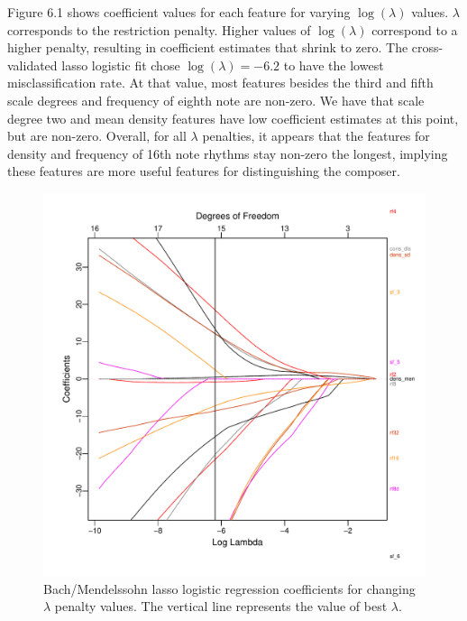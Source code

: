 \documentclass[12pt,twoside]{reedthesis}
\theoremstyle{definition}
\theoremstyle{definition}
\theoremstyle{definition}
\theoremstyle{remark}
\begin{document}
Figure 6.1 shows coefficient values for each feature for varying
\(\log(\lambda)\) values. \(\lambda\) corresponds to the restriction
penalty. Higher values of \(\log(\lambda)\) correspond to a higher
penalty, resulting in coefficient estimates that shrink to zero. The
cross-validated lasso logistic fit chose \(\log(\lambda) = -6.2\) to
have the lowest misclassification rate. At that value, most features
besides the third and fifth scale degrees and frequency of eighth note
are non-zero. We have that scale degree two and mean density features
have low coefficient estimates at this point, but are non-zero. Overall,
for all \(\lambda\) penalties, it appears that the features for density
and frequency of 16th note rhythms stay non-zero the longest, implying
these features are more useful features for distinguishing the composer.
\begin{figure}[H]
\centering
\includegraphics[scale = .6]{images/lasso_coef_b.pdf}
\caption{Bach/Mendelssohn lasso logistic regression coefficients for changing $\lambda$ penalty values. The vertical line represents the value of best $\lambda$.}
\label{subd}
\end{figure}
\end{document}
